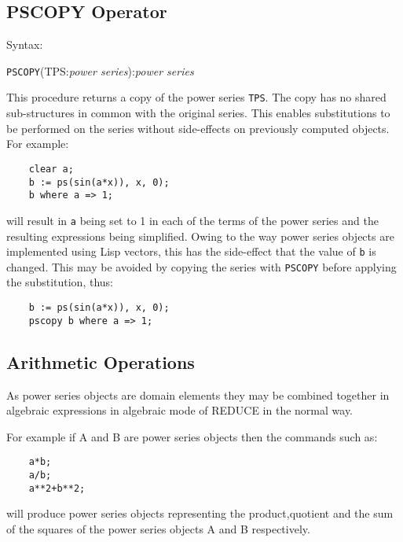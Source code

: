 \subsection{PSCOPY Operator}

Syntax:

\hspace*{2em} {\tt PSCOPY}(TPS:{\em power series}):{\em power series}

This procedure returns a copy of the power series {\tt TPS}. The copy
has no shared sub-structures in common with the original series.  This
enables substitutions to be performed on the series without
side-effects on previously computed objects. For example:

\begin{verbatim}
    clear a;
    b := ps(sin(a*x)), x, 0);
    b where a => 1;
\end{verbatim}

will result in {\tt a} being set to 1 in each of the terms of the
power series and the resulting expressions being simplified. Owing to
the way power series objects are implemented using Lisp vectors, this
has the side-effect that the value of {\tt b} is changed.  This may be
avoided by copying the series with {\tt PSCOPY} before applying the
substitution, thus:

\begin{verbatim}
    b := ps(sin(a*x)), x, 0);
    pscopy b where a => 1;
\end{verbatim}


\subsection{Arithmetic Operations}

As power series objects are domain elements they may be combined
together in algebraic expressions in algebraic mode of REDUCE in the
normal way.

For example if A and B are power series objects then the commands
such as:

 
 
\begin{verbatim}
    a*b;
    a/b;
    a**2+b**2;
\end{verbatim}

will produce power series objects representing the product,quotient
and the sum of the squares of the power series objects A and B
respectively.

